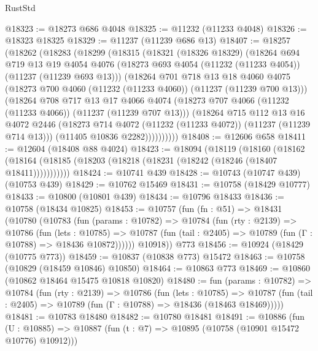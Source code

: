 \begin{lexlean}{RustStd}
\begin{coremodule}
@18323 := @18273 @686 @4048
@18325 := @11232 (@11233 @4048)
@18326 := @18323 @18325
@18329 := @11237 (@11239 @686 @13)
@18407 := @18257
    (@18262
      (@18283
        (@18299
          (@18315
            (@18321
              (@18326 @18329)
              (@18264
                @694
                @719
                @13
                @19
                @4054
                @4076
                (@18273 @693 @4054 (@11232 (@11233 @4054)) (@11237 (@11239 @693 @13)))
                (@18264
                  @701
                  @718
                  @13
                  @18
                  @4060
                  @4075
                  (@18273 @700 @4060 (@11232 (@11233 @4060)) (@11237 (@11239 @700 @13)))
                  (@18264
                    @708
                    @717
                    @13
                    @17
                    @4066
                    @4074
                    (@18273 @707 @4066 (@11232 (@11233 @4066)) (@11237 (@11239 @707 @13)))
                    (@18264
                      @715
                      @112
                      @13
                      @16
                      @4072
                      @2446
                      (@18273 @714 @4072 (@11232 (@11233 @4072)) (@11237 (@11239 @714 @13)))
                      (@11405 @10836 @2282))))))))))
@18408 := @12606 @658
@18411 := @12604 (@18408 @88 @4024)
@18423 := @18094
    (@18119
      (@18160
        (@18162 (@18164 (@18185 (@18203 (@18218 (@18231 (@18242 (@18246 (@18407 @18411)))))))))))
@18424 := @10741 @439
@18428 := @10743 (@10747 @439) (@10753 @439)
@18429 := @10762 @15469
@18431 := @10758 (@18429 @10777)
@18433 := @10800 (@10801 @439)
@18434 := @10796 @18433
@18436 := @10758 (@18434 @10825)
@18453 := @10757
    (fun (fn : @51) =>
    @18431
      (@10780
        (@10783
          (fun (params : @10782) =>
          @10784
            (fun (rty : @2139) =>
            @10786
              (fun (lets : @10785) =>
              @10787 (fun (tail : @2405) => @10789 (fun (Γ : @10788) => @18436 @10872))))))
        @10918))
    @773
@18456 := @10924 (@18429 (@10775 @773))
@18459 := @10837 (@10838 @773) @15472
@18463 := @10758 (@10829 (@18459 @10846) @10850)
@18464 := @10863 @773
@18469 := @10860 (@10862 @18464 @15475 @10818 @10820)
@18480 := fun (params : @10782) =>
  @10784
    (fun (rty : @2139) =>
    @10786
      (fun (lets : @10785) =>
      @10787 (fun (tail : @2405) => @10789 (fun (Γ : @10788) => @18436 (@18463 @18469)))))
@18481 := @10783 @18480
@18482 := @10780 @18481
@18491 := @10886
    (fun (U : @10885) => @10887 (fun (t : @7) => @10895 (@10758 (@10901 @15472 @10776) @10912)))

\end{coremodule}
\end{lexlean}
